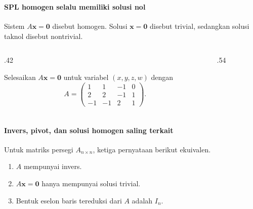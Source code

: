 \documentclass{../../kalkulus-ppt}
\newcommand{\vect}[1]{\mathbf{#1}}
\begin{document}
\begin{frame}
    \frametitle{\insertsection}
    \framesubtitle{SPL homogen selalu memiliki solusi nol}
    \begin{definisi}
        Sistem $A\vect{x}=\vect{0}$ disebut homogen. Solusi $\vect{x}=\vect{0}$ disebut trivial, sedangkan solusi taknol disebut nontrivial.
    \end{definisi}
    \begin{columns}[c,onlytextwidth]
        \begin{column}{.42\textwidth}
            \begin{contoh}
                Selesaikan $A\vect{x}=\vect{0}$ untuk variabel $(x,y,z,w)$ dengan
                \[
                    A=\begin{pmatrix}1&1&-1&0\\2&2&-1&1\\-1&-1&2&1\end{pmatrix}.
                \]
            \end{contoh}
        \end{column}
        \begin{column}{.54\textwidth}
        \end{column}
    \end{columns}
\end{frame}

\begin{frame}
    \frametitle{\insertsection}
    \framesubtitle{Invers, pivot, dan solusi homogen saling terkait}
    \begin{teorema}
        Untuk matriks persegi $A_{n\times n}$, ketiga pernyataan berikut ekuivalen.
        \begin{enumerate}
            \item $A$ mempunyai invers.
            \item $A\vect{x}=\vect{0}$ hanya mempunyai solusi trivial.
            \item Bentuk eselon baris tereduksi dari $A$ adalah $I_n$.
        \end{enumerate}
    \end{teorema}
\end{frame}
\end{document}
